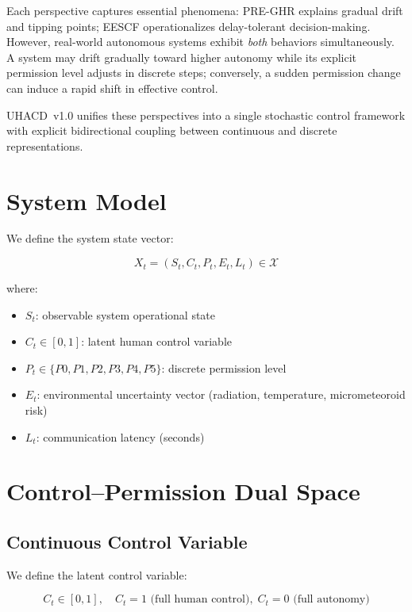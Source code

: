 \documentclass[conference]{IEEEtran}
\begin{document}
Each perspective captures essential phenomena: PRE-GHR explains gradual drift and tipping points; EESCF operationalizes delay-tolerant decision-making. However, real-world autonomous systems exhibit \emph{both} behaviors simultaneously. A system may drift gradually toward higher autonomy while its explicit permission level adjusts in discrete steps; conversely, a sudden permission change can induce a rapid shift in effective control.

UHACD~v1.0 unifies these perspectives into a single stochastic control framework with explicit bidirectional coupling between continuous and discrete representations.

\section{System Model}

We define the system state vector:

\begin{equation}
X_t = (S_t, C_t, P_t, E_t, L_t) \in \mathcal{X}
\end{equation}

where:
\begin{itemize}
\item $S_t$: observable system operational state
\item $C_t \in [0,1]$: latent human control variable
\item $P_t \in \{P0,P1,P2,P3,P4,P5\}$: discrete permission level
\item $E_t$: environmental uncertainty vector (radiation, temperature, micrometeoroid risk)
\item $L_t$: communication latency (seconds)
\end{itemize}

\section{Control--Permission Dual Space}

\subsection{Continuous Control Variable}

We define the latent control variable:

\begin{equation}
C_t \in [0,1], \quad C_t = 1 \text{ (full human control)}, \; C_t = 0 \text{ (full autonomy)}
\end{equation}
\end{document}
